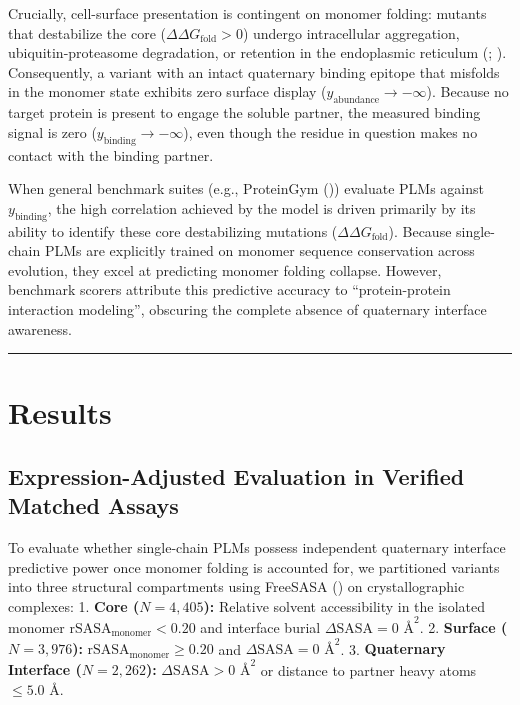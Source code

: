 \documentclass[
  11pt,
  us-letterpaper,
  DIV=11,
  numbers=noendperiod]{scrartcl}
\begin{document}
Crucially, cell-surface presentation is contingent on monomer folding:
mutants that destabilize the core (\(\Delta\Delta G_{\text{fold}} > 0\))
undergo intracellular aggregation, ubiquitin-proteasome degradation, or
retention in the endoplasmic reticulum
(;
). Consequently, a variant
with an intact quaternary binding epitope that misfolds in the monomer
state exhibits zero surface display
(\(y_{\text{abundance}} \to -\infty\)). Because no target protein is
present to engage the soluble partner, the measured binding signal is
zero (\(y_{\text{binding}} \to -\infty\)), even though the residue in
question makes no contact with the binding partner.

When general benchmark suites (e.g., ProteinGym
()) evaluate PLMs
against \(y_{\text{binding}}\), the high correlation achieved by the
model is driven primarily by its ability to identify these core
destabilizing mutations (\(\Delta\Delta G_{\text{fold}}\)). Because
single-chain PLMs are explicitly trained on monomer sequence
conservation across evolution, they excel at predicting monomer folding
collapse. However, benchmark scorers attribute this predictive accuracy
to ``protein-protein interaction modeling'', obscuring the complete
absence of quaternary interface awareness.

\begin{center}\rule{0.5\linewidth}{0.5pt}\end{center}

\section{Results}\label{sec-results}

\subsection{Expression-Adjusted Evaluation in Verified Matched
Assays}\label{expression-adjusted-evaluation-in-verified-matched-assays}

To evaluate whether single-chain PLMs possess independent quaternary
interface predictive power once monomer folding is accounted for, we
partitioned variants into three structural compartments using FreeSASA
() on
crystallographic complexes: 1. \textbf{Core (\(N = 4,405\)):} Relative
solvent accessibility in the isolated monomer
\(\text{rSASA}_{\text{monomer}} < 0.20\) and interface burial
\(\Delta \text{SASA} = 0\text{ \AA}^2\). 2. \textbf{Surface
(\(N = 3,976\)):} \(\text{rSASA}_{\text{monomer}} \ge 0.20\) and
\(\Delta \text{SASA} = 0\text{ \AA}^2\). 3. \textbf{Quaternary Interface
(\(N = 2,262\)):} \(\Delta \text{SASA} > 0\text{ \AA}^2\) or distance to
partner heavy atoms \(\le 5.0\text{ \AA}\).
\end{document}
